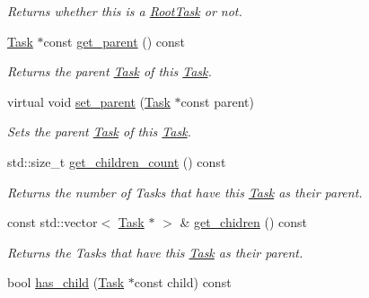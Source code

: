 \begin{DoxyCompactItemize}
\begin{DoxyCompactList}\small\item\em Returns whether this is a \hyperlink{classsigma_1_1core_1_1tasks_1_1_root_task}{Root\+Task} or not. \end{DoxyCompactList}\item 
\hyperlink{classsigma_1_1core_1_1tasks_1_1_task}{Task} $\ast$const \hyperlink{classsigma_1_1core_1_1tasks_1_1_task_a6949e9ea07ce3738f29c39b25acb9f26}{get\+\_\+parent} () const 
\begin{DoxyCompactList}\small\item\em Returns the parent \hyperlink{classsigma_1_1core_1_1tasks_1_1_task}{Task} of this \hyperlink{classsigma_1_1core_1_1tasks_1_1_task}{Task}. \end{DoxyCompactList}\item 
virtual void \hyperlink{classsigma_1_1core_1_1tasks_1_1_task_a975655055e70f4a2228153e84ff4e725}{set\+\_\+parent} (\hyperlink{classsigma_1_1core_1_1tasks_1_1_task}{Task} $\ast$const parent)
\begin{DoxyCompactList}\small\item\em Sets the parent \hyperlink{classsigma_1_1core_1_1tasks_1_1_task}{Task} of this \hyperlink{classsigma_1_1core_1_1tasks_1_1_task}{Task}. \end{DoxyCompactList}\item 
\hypertarget{classsigma_1_1core_1_1tasks_1_1_task_a75a3b0784751a8e82b56593407ba8858}{}std\+::size\+\_\+t \hyperlink{classsigma_1_1core_1_1tasks_1_1_task_a75a3b0784751a8e82b56593407ba8858}{get\+\_\+children\+\_\+count} () const \label{classsigma_1_1core_1_1tasks_1_1_task_a75a3b0784751a8e82b56593407ba8858}

\begin{DoxyCompactList}\small\item\em Returns the number of Tasks that have this \hyperlink{classsigma_1_1core_1_1tasks_1_1_task}{Task} as their parent. \end{DoxyCompactList}\item 
\hypertarget{classsigma_1_1core_1_1tasks_1_1_task_a3f6629626db9f1f283db8f7b897b99da}{}const std\+::vector$<$ \hyperlink{classsigma_1_1core_1_1tasks_1_1_task}{Task} $\ast$ $>$ \& \hyperlink{classsigma_1_1core_1_1tasks_1_1_task_a3f6629626db9f1f283db8f7b897b99da}{get\+\_\+chidren} () const \label{classsigma_1_1core_1_1tasks_1_1_task_a3f6629626db9f1f283db8f7b897b99da}

\begin{DoxyCompactList}\small\item\em Returns the Tasks that have this \hyperlink{classsigma_1_1core_1_1tasks_1_1_task}{Task} as their parent. \end{DoxyCompactList}\item 
\hypertarget{classsigma_1_1core_1_1tasks_1_1_task_a99e98800a473e1a05093d64853b75740}{}bool \hyperlink{classsigma_1_1core_1_1tasks_1_1_task_a99e98800a473e1a05093d64853b75740}{has\+\_\+child} (\hyperlink{classsigma_1_1core_1_1tasks_1_1_task}{Task} $\ast$const child) const \label{classsigma_1_1core_1_1tasks_1_1_task_a99e98800a473e1a05093d64853b75740}


\end{DoxyCompactItemize}

